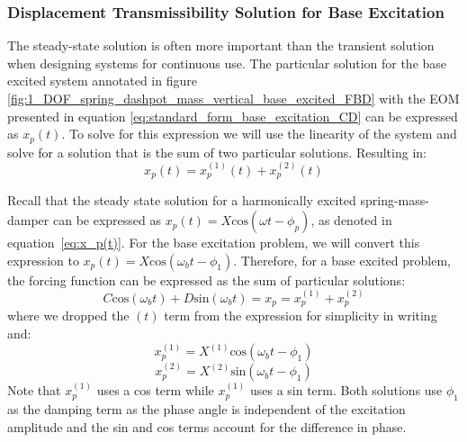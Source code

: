 \documentclass[12pt,letter]{article}
\numberwithin{ex}{section} %
\numberwithin{re}{section} %
\numberwithin{vcs}{section} %
\begin{document}
		
			\subsubsection{Displacement Transmissibility Solution for Base Excitation}
				The steady-state solution is often more important than the transient solution when designing systems for continuous use. The particular solution for the base excited system annotated in figure \ref{fig:1_DOF_spring_dashpot_mass_vertical_base_excited_FBD} with the EOM presented in equation \ref{eq:standard_form_base_excitation_CD} can be expressed as $	x_p(t)$. To solve for this expression we will use the linearity of the system and solve for a solution that is the sum of two particular solutions. Resulting in:
				\begin{equation}
				 x_p(t) = 	x_p^{(1)}(t) + 	x_p^{(2)}(t)  
				\end{equation}
				
				 Recall that the steady state solution for a harmonically excited spring-mass-damper can be expressed as $x_p(t) = X\text{cos}(\omega t - \phi_p)$, as denoted in equation~\ref{eq:x_p(t)}. For the base excitation problem, we will convert this expression to $x_p(t) = X\text{cos}(\omega_b t - \phi_1)$. Therefore, for a base excited problem, the forcing function can be expressed as the sum of particular solutions:
				\begin{equation}
					C \text{cos}(\omega_b t)  + D \text{sin}(\omega_b t)   = x_p = 	x_p^{(1)} + 	x_p^{(2)} 
				\end{equation}
				where we dropped the $(t)$ term from the expression for simplicity in writing and:
				\begin{equation}
					x_p^{(1)} = X^{(1)}\text{cos}(\omega_b t - \phi_1)
				\end{equation}
				\begin{equation}
					x_p^{(2)} = X^{(2)} \text{sin}(\omega_b t - \phi_1)
				\end{equation}
				Note that $x_p^{(1)}$ uses a cos term while $x_p^{(1)}$ uses a sin term. Both solutions use $\phi_1$ as the damping term as the phase angle is independent of the excitation amplitude and the sin and cos terms account for the difference in phase. 
				
\end{document}
